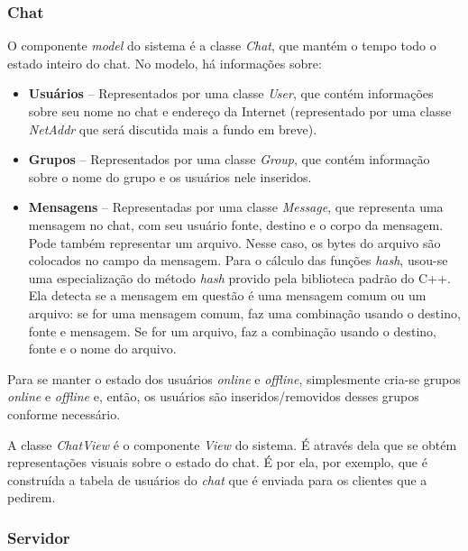 \documentclass[11pt]{article}
\newcommand{\tit}[1]{\textit{#1}}
\newcommand{\tbf}[1]{\textbf{#1}}
\begin{document}
\subsubsection{Chat}
O componente \tit{model} do sistema é a classe \tit{Chat}, que mantém o tempo
todo o estado inteiro do chat. No modelo, há informações sobre:
\begin{itemize}
	\item \tbf{Usuários} -- Representados por uma classe \tit{User}, que contém
		informações sobre seu nome no chat e endereço da Internet
		(representado por uma classe \tit{NetAddr} que será discutida mais 
		a fundo em breve).
	\item \tbf{Grupos} -- Representados por uma classe \tit{Group}, que contém 
		informação sobre o nome do grupo e os usuários nele inseridos.
	\item \tbf{Mensagens} -- Representadas por uma classe \tit{Message}, que
		representa uma mensagem no chat, com seu usuário fonte, destino e o
		corpo da mensagem. Pode também representar um arquivo. Nesse caso,
		os bytes do arquivo são colocados no campo da mensagem. 
		Para o cálculo das funções \tit{hash}, usou-se uma especialização
		do método \tit{hash} provido pela biblioteca padrão do C++.
		Ela detecta se a mensagem em questão é uma mensagem comum ou um
		arquivo: se for uma mensagem comum, faz uma combinação usando
		o destino, fonte e mensagem. Se for um arquivo, faz a combinação
		usando o destino, fonte e o nome do arquivo.
\end{itemize}

Para se manter o estado dos usuários \tit{online} e \tit{offline}, simplesmente
cria-se grupos \tit{online} e \tit{offline} e, então, os usuários são
inseridos/removidos desses grupos conforme necessário.

A classe \tit{ChatView} é o componente \tit{View} do sistema. 
É através dela que se obtém representações visuais sobre o estado do chat. 
É por ela, por exemplo, que é construída a tabela de usuários do \tit{chat}
que é enviada para os clientes que a pedirem.

\subsubsection{Servidor}
\end{document}
